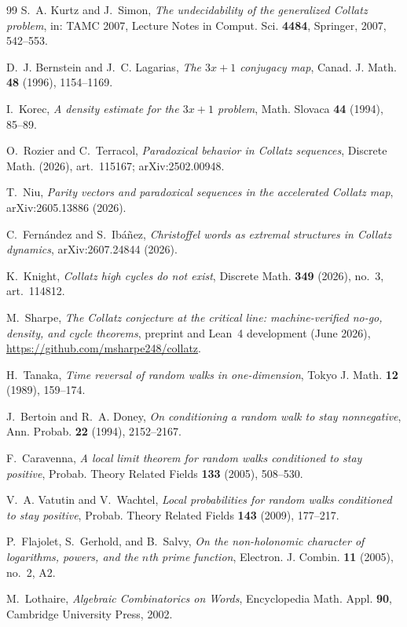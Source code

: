 \documentclass[11pt]{article}
\theoremstyle{definition}
\begin{document}
\begin{thebibliography}{99}
S.~A. Kurtz and J.~Simon,
\emph{The undecidability of the generalized Collatz problem},
in: TAMC 2007, Lecture Notes in Comput. Sci. \textbf{4484}, Springer, 2007,
542--553.

D.~J. Bernstein and J.~C. Lagarias,
\emph{The $3x+1$ conjugacy map},
Canad. J. Math. \textbf{48} (1996), 1154--1169.

I.~Korec,
\emph{A density estimate for the $3x+1$ problem},
Math. Slovaca \textbf{44} (1994), 85--89.

O.~Rozier and C.~Terracol,
\emph{Paradoxical behavior in Collatz sequences},
Discrete Math. (2026), art.~115167; arXiv:2502.00948.

T.~Niu,
\emph{Parity vectors and paradoxical sequences in the accelerated Collatz map},
arXiv:2605.13886 (2026).

C.~Fern\'andez and S.~Ib\'a\~nez,
\emph{Christoffel words as extremal structures in Collatz dynamics},
arXiv:2607.24844 (2026).

K.~Knight,
\emph{Collatz high cycles do not exist},
Discrete Math. \textbf{349} (2026), no.~3, art.~114812.

M.~Sharpe,
\emph{The Collatz conjecture at the critical line: machine-verified no-go,
density, and cycle theorems},
preprint and Lean~4 development (June 2026),
\url{https://github.com/msharpe248/collatz}.

H.~Tanaka,
\emph{Time reversal of random walks in one-dimension},
Tokyo J. Math. \textbf{12} (1989), 159--174.

J.~Bertoin and R.~A. Doney,
\emph{On conditioning a random walk to stay nonnegative},
Ann. Probab. \textbf{22} (1994), 2152--2167.

F.~Caravenna,
\emph{A local limit theorem for random walks conditioned to stay positive},
Probab. Theory Related Fields \textbf{133} (2005), 508--530.

V.~A. Vatutin and V.~Wachtel,
\emph{Local probabilities for random walks conditioned to stay positive},
Probab. Theory Related Fields \textbf{143} (2009), 177--217.

P.~Flajolet, S.~Gerhold, and B.~Salvy,
\emph{On the non-holonomic character of logarithms, powers, and the
$n$th prime function},
Electron. J. Combin. \textbf{11} (2005), no.~2, A2.

M.~Lothaire,
\emph{Algebraic Combinatorics on Words},
Encyclopedia Math. Appl. \textbf{90}, Cambridge University Press, 2002.

\end{thebibliography}
\end{document}
